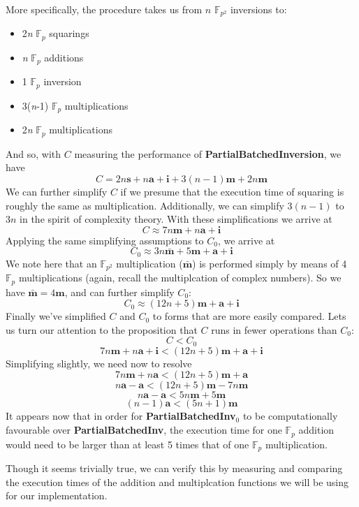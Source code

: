 More specifically, the procedure takes us from $n$ $\mathbb{F}_{p^{2}}$  inversions to:
\begin{center}
\begin{itemize}
\item 2\textit{n} $\mathbb{F}_{p}$ squarings
\item \textit{n} $\mathbb{F}_{p}$ additions
\item 1 $\mathbb{F}_{p}$ inversion
\item 3(\textit{n}-1) $\mathbb{F}_{p}$ multiplications
\item 2\textit{n} $\mathbb{F}_{p}$ multiplications
\end{itemize}
\end{center}
\noindent
And so, with $C$ measuring the performance of \textbf{PartialBatchedInversion}, we have
$$
C = 2n\textbf{s} + n\textbf{a} + \textbf{i} + 3(n-1)\textbf{m} + 2n\textbf{m}
$$
We can further simplify $C$ if we presume that the execution time of squaring is roughly the same as multiplication. Additionally, we can simplify $3(n-1)$ to $3n$ in the spirit of complexity theory. With these simplifications we arrive at
$$
C \approx 7n\textbf{m} + n\textbf{a} + \textbf{i}
$$
Applying the same simplifying assumptions to $C_0$, we arrive at
$$
C_0 \approx 3n\bar{\textbf{m}} + 5\textbf{m} + \textbf{a} + \textbf{i}
$$
We note here that an $\mathbb{F}_{p^2}$ multiplication ($\bar{\textbf{m}}$) is performed simply by means of 4 $\mathbb{F}_{p}$ multiplications (again, recall the multiplcation of complex numbers). So we have $\bar{\textbf{m}} = 4\textbf{m}$, and can further simplify $C_0$:
$$
C_0 \approx (12n + 5)\textbf{m} + \textbf{a} + \textbf{i}
$$
Finally we've simplified $C$ and $C_0$ to forms that are more easily compared. Lets us turn our attention to the proposition that $C$ runs in fewer operations than $C_0$:
$$
C < C_0
$$
$$
7n\textbf{m} + n\textbf{a} + \textbf{i} < (12n + 5)\textbf{m} + \textbf{a} + \textbf{i}
$$
Simplifying slightly, we need now to resolve
$$
7n\textbf{m} + n\textbf{a} < (12n + 5)\textbf{m} + \textbf{a}
$$
$$
n\textbf{a} - \textbf{a} < (12n + 5)\textbf{m} - 7n\textbf{m}
$$
$$
n\textbf{a} - \textbf{a} < 5n\textbf{m} + 5\textbf{m}
$$
$$
(n - 1)\textbf{a} < (5n + 1)\textbf{m}
$$
It appears now that in order for \textbf{PartialBatchedInv}$_0$ to be computationally favourable over \textbf{PartialBatchedInv}, the execution time for one $\mathbb{F}_p$ addition would need to be larger than at least 5 times that of one $\mathbb{F}_p$ multiplication.

Though it seems trivially true, we can verify this by measuring and comparing the execution times of the \sidh addition and multiplcation functions we will be using for our implementation.

